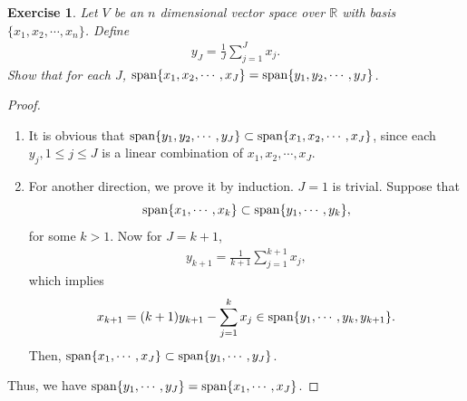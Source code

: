 \documentclass[10pt]{book}
\newtheorem{exercise}{Exercise}[section]
\theoremstyle{definition}
\numberwithin{equation}{chapter}
\begin{document}
\medskip

\begin{exercise}
Let $V$ be an $n$ dimensional vector space over $\mathbb{R}$ with basis $\{x_1, x_2, \cdots, x_n\}$. Define 
\begin{align*}
    y_J = \frac{1}{J} \sum^J_{j=1} x_j.
\end{align*}
Show that for each $J$, ${\rm span} \{x_1, x_2, \cdots, x_J\} = {\rm span} \{y_1, y_2, \cdots, y_J\}$.
\end{exercise}
\begin{proof}
~\begin{enumerate}[label=(\alph*)]
    \item It is obvious that ${\rm span} \{y_1, y_2, \cdots, y_J\} \subset {\rm span} \{x_1, x_2, \cdots, x_J\}$, since each $y_j, 1 \leq j \leq J$ is a linear combination of $x_1, x_2, \cdots, x_J$.
    
    \item For another direction, we prove it by induction. $J = 1$ is trivial. Suppose that $${\rm span} \{x_1, \cdots, x_k\} \subset {\rm span} \{y_1, \cdots, y_k\},$$ 
    for some $k > 1$. Now for $J = k + 1$, 
    \begin{align*}
        y_{k+1} = \frac{1}{k+1} \sum^{k+1}_{j=1} x_j,
    \end{align*}
    which implies
    \begin{align*}
        x_{k+1} = (k+1) y_{k+1} - \sum^k_{j=1} x_j \in {\rm span} \{y_1, \cdots, y_k, y_{k+1}\}.
    \end{align*}
    Then, ${\rm span} \{x_1, \cdots, x_J\} \subset {\rm span} \{y_1, \cdots, y_J\}$.
\end{enumerate}
Thus, we have ${\rm span} \{y_1, \cdots, y_J\} = {\rm span} \{x_1, \cdots, x_J\}$.
\end{proof}

\medskip
\end{document}

